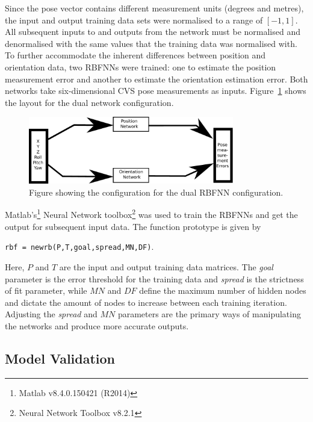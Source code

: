 Since the pose vector contains different measurement units (degrees and metres), the input and output training data sets were normalised to a range of $[-1, 1]$. All subsequent inputs to and outputs from the network must be normalised and denormalised with the same values that the training data was normalised with. To further accommodate the inherent differences between position and orientation data, two RBFNNs were trained: one to estimate the position measurement error and another to estimate the orientation estimation error. Both networks take six-dimensional CVS pose measurements as inputs. Figure~\ref{fig:chap4-two-networks} shows the layout for the dual network configuration.

\begin{figure}
  \centering
  \includegraphics[width=0.8\textwidth]{figures/chapter4/two_network}
  \caption{Figure showing the configuration for the dual RBFNN configuration.}
  \label{fig:chap4-two-networks}
\end{figure}

Matlab's\footnote{Matlab v8.4.0.150421 (R2014)} Neural Network toolbox\footnote{Neural Network Toolbox v8.2.1} was used to train the RBFNNs and get the output for subsequent input data. The function prototype is given by 

\begin{center}
  \verb|rbf = newrb(P,T,goal,spread,MN,DF)|.
\end{center}

Here, $P$ and $T$ are the input and output training data matrices. The \emph{goal} parameter is the error threshold for the training data and \emph{spread} is the strictness of fit parameter, while $\mathit{MN}$ and $\mathit{DF}$ define the maximum number of hidden nodes and dictate the amount of nodes to increase between each training iteration. Adjusting the \emph{spread} and $\mathit{MN}$ parameters are the primary ways of manipulating the networks and produce more accurate outputs. 

\subsection{Model Validation}

